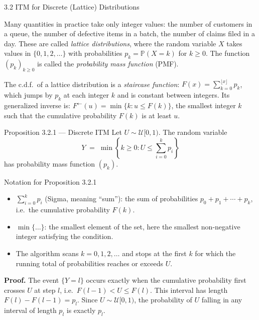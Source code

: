 \documentclass[aspectratio=169,10pt]{beamer}
\newcommand{\PP}{\mathbb{P}}
\newcommand{\UU}{\mathcal{U}}
\newcommand{\FInv}{F^{\leftarrow}}
\begin{document}
\begin{frame}[allowframebreaks]{3.2 ITM for Discrete (Lattice) Distributions}

Many quantities in practice take only integer values: the number of customers
in a queue, the number of defective items in a batch, the number of claims filed
in a day.  These are called \emph{lattice distributions}, where the random
variable $X$ takes values in $\{0, 1, 2, \ldots\}$ with probabilities
$p_k = \PP(X = k)$ for $k \ge 0$.  The function $(p_k)_{k \ge 0}$ is called
the \emph{probability mass function} (PMF).

The c.d.f.\ of a lattice distribution is a \emph{staircase function}:
$F(x) = \sum_{k=0}^{\lfloor x \rfloor} p_k$, which jumps by $p_k$ at each
integer $k$ and is constant between integers.  Its generalized inverse is:
$\FInv(u) = \min\{k : u \le F(k)\}$, the smallest integer $k$ such that the
cumulative probability $F(k)$ is at least $u$.

\begin{block}{Proposition 3.2.1 --- Discrete ITM}
  Let $U \sim \UU[0,1)$.  The random variable
  \[
    Y \;=\; \min\!\left\{k \ge 0 : U \le \sum_{i=0}^{k} p_i\right\}
  \]
  has probability mass function $(p_k)$.
\end{block}

\begin{block}{Notation for Proposition 3.2.1}
  \begin{itemize}
    \item $\sum_{i=0}^{k} p_i$ (Sigma, meaning ``sum''): the sum of probabilities
      $p_0 + p_1 + \cdots + p_k$, i.e.\ the cumulative probability $F(k)$.
    \item $\min\{\ldots\}$: the smallest element of the set, here the smallest
      non-negative integer satisfying the condition.
    \item The algorithm scans $k = 0, 1, 2, \ldots$ and stops at the first $k$
      for which the running total of probabilities reaches or exceeds $U$.
  \end{itemize}
\end{block}

\textbf{Proof.}  The event $\{Y = l\}$ occurs exactly when the cumulative
probability first crosses $U$ at step $l$, i.e.\ $F(l-1) < U \le F(l)$.
This interval has length $F(l) - F(l-1) = p_l$.  Since $U \sim \UU[0,1)$,
the probability of $U$ falling in any interval of length $p_l$ is exactly $p_l$.

\framebreak


\end{frame}
\end{document}
